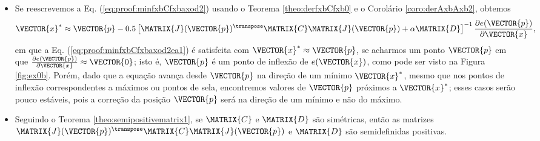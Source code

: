 \begin{myproofT}
\begin{itemize}
\item Se reescrevemos a Eq. (\ref{eq:proof:minfxbCfxbaxod2}) usando o Teorema \ref{theo:derfxbCfxb0}
e o Corolário \ref{coro:derAxbAxb2},
obtemos
\begin{equation}\label{eq:proof:minfxbCfxbaxod2ea1}
\VECTOR{x}^* \approx \VECTOR{p} -
0.5 \left[ \MATRIX{J}(\VECTOR{p})^{\transpose}\MATRIX{C} \MATRIX{J}(\VECTOR{p})+\alpha \MATRIX{D} \right]^{-1}
\frac{\partial e(\VECTOR{p})}{\partial \VECTOR{x} },
\end{equation}
em que a Eq. (\ref{eq:proof:minfxbCfxbaxod2ea1}) é satisfeita 
com $\VECTOR{x}^* \approx \VECTOR{p}$, 
se acharmos um ponto $\VECTOR{p}$ em que  
$\frac{\partial e(\VECTOR{p})}{\partial \VECTOR{x} }\approx \VECTOR{0}$; 
isto é, $\VECTOR{p}$ é um ponto de inflexão de $e(\VECTOR{x})$, 
como pode ser visto na Figura \ref{fig:ex0b}.
Porém, dado que a equação avança desde $\VECTOR{p}$ na direção de um mínimo $\VECTOR{x}^*$, 
mesmo que nos pontos de inflexão correspondentes a máximos ou pontos de sela,
encontremos valores de $\VECTOR{p}$ próximos a $\VECTOR{x}^*$;
 esses casos serão pouco estáveis, pois
a correção da posição $\VECTOR{p}$ será na direção de um mínimo e não do máximo.
\item Seguindo o Teorema \ref{theo:semipositivematrix1}, se $\MATRIX{C}$ e $\MATRIX{D}$ são simétricas, 
então as matrizes $\MATRIX{J}(\VECTOR{p})^{\transpose}\MATRIX{C} \MATRIX{J}(\VECTOR{p})$ e $\MATRIX{D}$
são semidefinidas positivas.


\end{itemize}
\end{myproofT}
